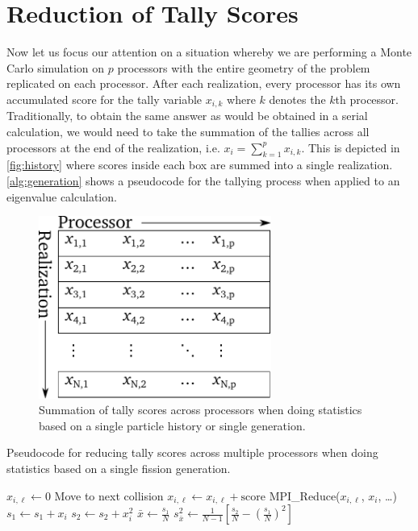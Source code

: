 \section{Reduction of Tally Scores}
\label{sec:tally-reduction}

Now let us focus our attention on a situation whereby we are performing a Monte
Carlo simulation on $p$ processors with the entire geometry of the problem
replicated on each processor. After each realization, every processor has its
own accumulated score for the tally variable $x_{i,k}$ where $k$ denotes the
$k$th processor. Traditionally, to obtain the same answer as would be obtained
in a serial calculation, we would need to take the summation of the tallies
across all processors at the end of the realization, i.e. $x_i = \sum_{k=1}^p
x_{i,k}$. This is depicted in \autoref{fig:history} where scores inside each box
are summed into a single realization. \autoref{alg:generation} shows a
pseudocode for the tallying process when applied to an eigenvalue calculation.
\begin{figure}[ht]
  \centering
  \includegraphics[width=3in]{figures/ch4/generation.pdf}
  \caption{Summation of tally scores across processors when doing statistics
    based on a single particle history or single generation.}
  \label{fig:history}
\end{figure}
\begin{algorithm}[htb]
  \caption{Pseudocode for reducing tally scores across multiple processors when
    doing statistics based on a single fission generation.}
  \label{alg:generation}
\begin{algorithmic}
   
    \State $x_{i,\ell} \gets 0$
     
        \State Move to next collision
        \State $x_{i,\ell} \gets x_{i,\ell} + \text{score}$
      \EndWhile
    \EndFor
    \State MPI\_Reduce($x_{i,\ell}$, $x_i$, \dots) 
    \State $s_1 \gets s_1 + x_i$ 
    \State $s_2 \gets s_2 + x_i^2$
  \EndFor
  \State $\bar{x} \gets \frac{s_1}{N}$ 
  \State $s^2_{\bar{x}} \gets \frac{1}{N-1} \left [ \frac{s_2}{N} - \left (
    \frac{s_1}{N} \right )^2 \right ]$
\end{algorithmic}
\end{algorithm}
